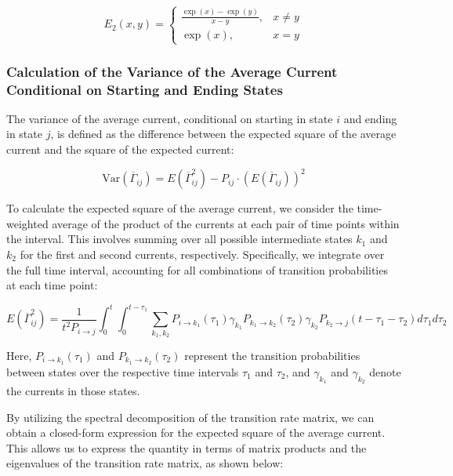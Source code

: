 \documentclass[pdflatex,sn-mathphys-num]{sn-jnl}%
\theoremstyle{thmstyleone}%
\theoremstyle{thmstyletwo}%
\theoremstyle{thmstylethree}%
\begin{document}
\begin{equation}
	E_2(x,y)= 
	\begin{cases}
		\frac{\exp(x)-\exp(y)}{x-y},& x\neq y\\
		\exp(x),              & x=y
	\end{cases}
\end{equation}



\subsubsection{Calculation of the Variance of the Average Current Conditional on Starting and Ending States}

The variance of the average current, conditional on starting in state \(i\) and ending in state \(j\), is defined as the difference between the expected square of the average current and the square of the expected current:

\begin{equation}
	\text{Var}(\overline{\Gamma}_{ij}) = E(\overline{\Gamma}_{ij}^2) - P_{ij} \cdot (E(\overline{\Gamma}_{ij}))^2
\end{equation}

To calculate the expected square of the average current, we consider the time-weighted average of the product of the currents at each pair of time points within the interval. This involves summing over all possible intermediate states \(k_1\) and \(k_2\) for the first and second currents, respectively. Specifically, we integrate over the full time interval, accounting for all combinations of transition probabilities at each time point:

\begin{equation}
	E(\overline{\Gamma}_{ij}^2) = \frac{1}{t^2 P_{i \rightarrow j}} \int_0^t \int_0^{t-\tau_1} \sum_{k_1, k_2} P_{i \rightarrow k_1}(\tau_1) \gamma_{k_1} P_{k_1 \rightarrow k_2}(\tau_2) \gamma_{k_2} P_{k_2 \rightarrow j}(t-\tau_1-\tau_2) d\tau_1 d\tau_2
\end{equation}

Here, \(P_{i \rightarrow k_1}(\tau_1)\) and \(P_{k_1 \rightarrow k_2}(\tau_2)\) represent the transition probabilities between states over the respective time intervals \(\tau_1\) and \(\tau_2\), and \(\gamma_{k_1}\) and \(\gamma_{k_2}\) denote the currents in those states. 

By utilizing the spectral decomposition of the transition rate matrix, we can obtain a closed-form expression for the expected square of the average current. This allows us to express the quantity in terms of matrix products and the eigenvalues of the transition rate matrix, as shown below:
\end{document}
